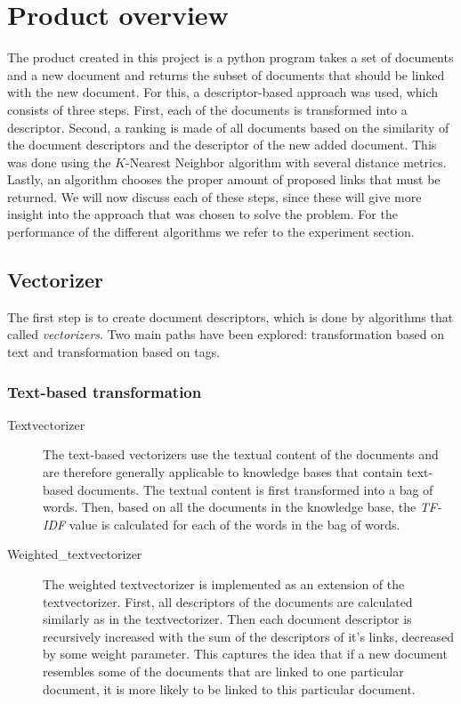\section{Product overview}

The product created in this project is a python program takes a set of
documents and a new document and returns the subset of documents that should be
linked with the new document. For this, a descriptor-based approach was used,
which consists of three steps. First, each of the documents is transformed
into a descriptor. Second, a ranking is made of all documents based on the
similarity of the document descriptors and the descriptor of the new added
document. This was done using the $K$-Nearest Neighbor algorithm with several
distance metrics. Lastly, an algorithm chooses the proper amount of proposed
links that must be returned. We will now discuss each of these steps, since these will give more
insight into the approach that was chosen to solve the problem. For the
performance of the different algorithms we refer to the experiment section. 

\subsection{Vectorizer}
The first step is to create document descriptors, which is done by algorithms that called \emph{vectorizers}. Two main paths have been explored: transformation based on text and transformation based on tags.

\subsubsection{Text-based transformation}
\begin{description}
\item [Textvectorizer] The text-based vectorizers use the textual content of the documents and are therefore generally applicable to knowledge bases that contain text-based documents. The textual content is first transformed into a bag of words. Then, based on all the documents in the knowledge base, the \emph{TF-IDF} value is calculated for each of the words in the bag of words.  

\item[Weighted\_textvectorizer] The weighted textvectorizer is implemented as an extension of the textvectorizer. First, all descriptors of the documents are calculated similarly as in the textvectorizer. Then each document descriptor is recursively increased with the sum of the descriptors of it's links, decreased by some weight parameter. This captures the idea that if a new document resembles some of the documents that are linked to one particular document, it is more likely to be linked to this particular document. 
\end{description}

